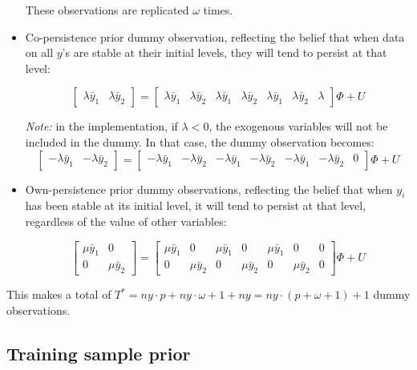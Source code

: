 \documentclass[11pt,a4paper]{article}
\begin{document}
\begin{itemize}
These observations are replicated $\omega$ times.

\item Co-persistence prior dummy observation, reflecting the belief that when data on all $y$'s are stable at their initial levels, they will tend to persist at that level:

$$\left[
\begin{array}{cc}
\lambda\bar{y}_1 & \lambda\bar{y}_2
\end{array}
\right]
=
\left[
\begin{array}{ccccccc}
\lambda\bar{y}_1 & \lambda\bar{y}_2 & \lambda\bar{y}_1 & \lambda\bar{y}_2 & \lambda\bar{y}_1 & \lambda\bar{y}_2 & \lambda
\end{array}
\right]\Phi + U$$

\textit{Note:} in the implementation, if $\lambda < 0$, the exogenous variables will not be included in the dummy. In that case, the dummy observation becomes:
$$\left[
\begin{array}{cc}
-\lambda\bar{y}_1 & -\lambda\bar{y}_2
\end{array}
\right]
=
\left[
\begin{array}{ccccccc}
-\lambda\bar{y}_1 & -\lambda\bar{y}_2 & -\lambda\bar{y}_1 & -\lambda\bar{y}_2 & -\lambda\bar{y}_1 & -\lambda\bar{y}_2 & 0
\end{array}
\right]\Phi + U$$

\item Own-persistence prior dummy observations, reflecting the belief that when $y_i$ has been
stable at its initial level, it will tend to persist at that level, regardless of the value of
other variables:

$$\left[
\begin{array}{cc}
\mu\bar{y}_1 & 0 \\
0 & \mu\bar{y}_2
\end{array}
\right]
=
\left[
\begin{array}{ccccccc}
\mu\bar{y}_1 & 0 & \mu\bar{y}_1 &0 & \mu\bar{y}_1 & 0 & 0 \\
0 & \mu\bar{y}_2 & 0 & \mu\bar{y}_2 & 0 &\mu\bar{y}_2 & 0
\end{array}
\right]\Phi + U$$


\end{itemize}

This makes a total of $T^* = ny\cdot p + ny\cdot\omega + 1 + ny = ny\cdot(p+\omega+1)+1$ dummy observations.

\subsection{Training sample prior}
\end{document}
